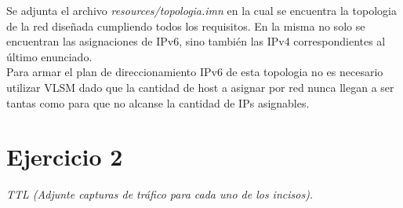 \documentclass[osajnl,twocolumn,showpacs,superscriptaddress,10pt]{revtex4-1} %
\begin{document}
Se adjunta el archivo \textit{resources/topologia.imn} en la cual se encuentra la topologia de la red diseñada
cumpliendo todos los requisitos. En la misma no solo se encuentran las asignaciones de IPv6, sino también las
IPv4 correspondientes al último enunciado. \\

Para armar el plan de direccionamiento IPv6 de esta topologia no es necesario utilizar VLSM dado que
la cantidad de host a asignar por red nunca llegan a ser tantas como para que no alcanse la cantidad
de IPs asignables.

\section{Ejercicio 2}

\textit{TTL (Adjunte capturas de tráfico para cada uno de los incisos).}
\end{document}
